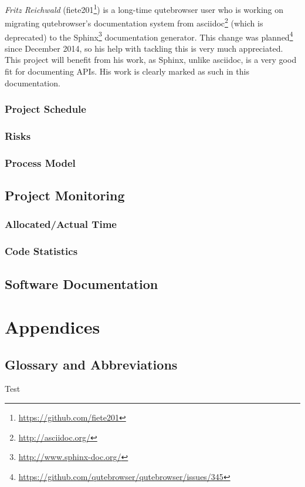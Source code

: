 \documentclass[a4paper,parskip=full]{scrreprt}
\begin{document}
\label{fiete}
\emph{Fritz Reichwald} (fiete201\footnote{\url{https://github.com/fiete201}})
is a long-time qutebrowser user who is working on migrating qutebrowser's
documentation system from asciidoc\footnote{\url{http://asciidoc.org/}} (which
is deprecated) to the Sphinx\footnote{\url{http://www.sphinx-doc.org/}}
documentation generator. This change was
planned\footnote{\url{https://github.com/qutebrowser/qutebrowser/issues/345}}
since December 2014, so his help with tackling this is very much appreciated.
This project will benefit from his work, as Sphinx, unlike asciidoc, is a
very good fit for documenting APIs. His work is clearly marked as such in this
documentation.

\section{Project Schedule}
\section{Risks}
\section{Process Model}


\chapter{Project Monitoring}
\section{Allocated/Actual Time}
\section{Code Statistics}


\chapter{Software Documentation}



\part{Appendices}


\chapter{Glossary and Abbreviations}

Test \citep{yapproach}

\renewcommand{\bibname}{\chapter{Literature and Sources}}


\end{document}
